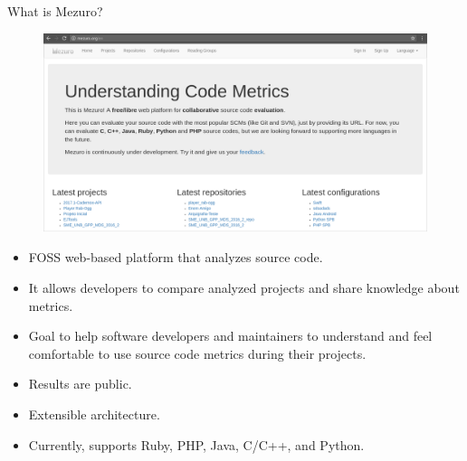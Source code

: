 \begin{block}{What is Mezuro?}
    \begin{figure}
        \begin{center}
            \includegraphics[width=\textwidth]{figures/MezuroHome.png}
            \label{fig:feature1}
        \end{center}
    \end{figure}

    \begin{itemize}
        \item FOSS web-based platform that analyzes source code.

        \item It allows developers to compare analyzed projects and share
            knowledge about metrics.

        \item Goal to help software developers and maintainers to understand
            and feel comfortable to use source code metrics during their projects.

        \item Results are public.

        \item Extensible architecture.

        \item Currently, supports Ruby, PHP, Java, C/C++, and Python.

    \end{itemize}
\end{block}
